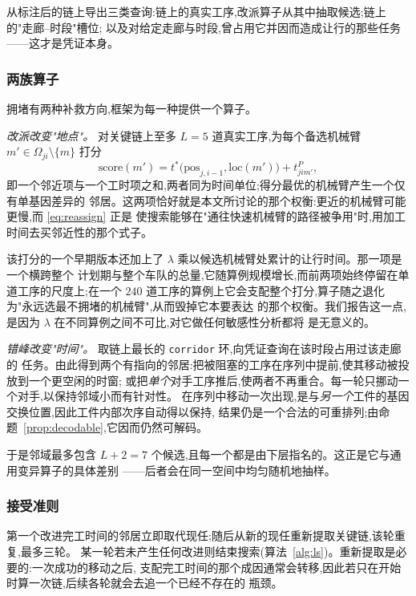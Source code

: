 \documentclass[manuscript,screen,review]{acmart}
\begin{document}
从标注后的链上导出三类查询:链上的真实工序,改派算子从其中抽取候选;链上的"走廊--时段"槽位;
以及对给定走廊与时段,曾占用它并因而造成让行的那些任务——这才是凭证本身。

\subsubsection{两族算子}
拥堵有两种补救方向,框架为每一种提供一个算子。

\emph{改派改变"地点"。} 对关键链上至多 $L=5$ 道真实工序,为每个备选机械臂
$m'\in\Omega_{ji}\setminus\{m\}$ 打分
\begin{equation}
\label{eq:reassign}
\mathrm{score}(m')=t^{*}\bigl(\mathrm{pos}_{j,i-1},\mathrm{loc}(m')\bigr)
+t^{P}_{jim'},
\end{equation}
即一个邻近项与一个工时项之和,两者同为时间单位;得分最优的机械臂产生一个仅有单基因差异的
邻居。这两项恰好就是本文所讨论的那个权衡:更近的机械臂可能更慢,而 \eqref{eq:reassign} 正是
使搜索能够在"通往快速机械臂的路径被争用"时,用加工时间去买邻近性的那个式子。

该打分的一个早期版本还加上了 $\lambda$ 乘以候选机械臂处累计的让行时间。那一项是一个横跨整个
计划期与整个车队的总量,它随算例规模增长,而前两项始终停留在单道工序的尺度上;在一个 $240$
道工序的算例上它会支配整个打分,算子随之退化为"永远选最不拥堵的机械臂",从而毁掉它本要表达
的那个权衡。我们报告这一点,是因为 $\lambda$ 在不同算例之间不可比,对它做任何敏感性分析都将
是无意义的。

\emph{错峰改变"时间"。} 取链上最长的 \texttt{corridor} 环,向凭证查询在该时段占用过该走廊的
任务。由此得到两个有指向的邻居:把被阻塞的工序在序列中提前,使其移动被投放到一个更空闲的时窗;
或把\emph{单个}对手工序推后,使两者不再重合。每一轮只挪动一个对手,以保持邻域小而有针对性。
在序列中移动一次出现,是与\emph{另一个}工件的基因交换位置,因此工件内部次序自动得以保持,
结果仍是一个合法的可重排列;由命题~\ref{prop:decodable},它因而仍然可解码。

于是邻域最多包含 $L+2=7$ 个候选,且每一个都是由下层指名的。这正是它与通用变异算子的具体差别
——后者会在同一空间中均匀随机地抽样。

\subsubsection{接受准则}
第一个改进完工时间的邻居立即取代现任;随后从新的现任重新提取关键链,该轮重复,最多三轮。
某一轮若未产生任何改进则结束搜索(算法~\ref{alg:ls})。重新提取是必要的:一次成功的移动之后,
支配完工时间的那个成因通常会转移,因此若只在开始时算一次链,后续各轮就会去追一个已经不存在的
瓶颈。
\end{document}
